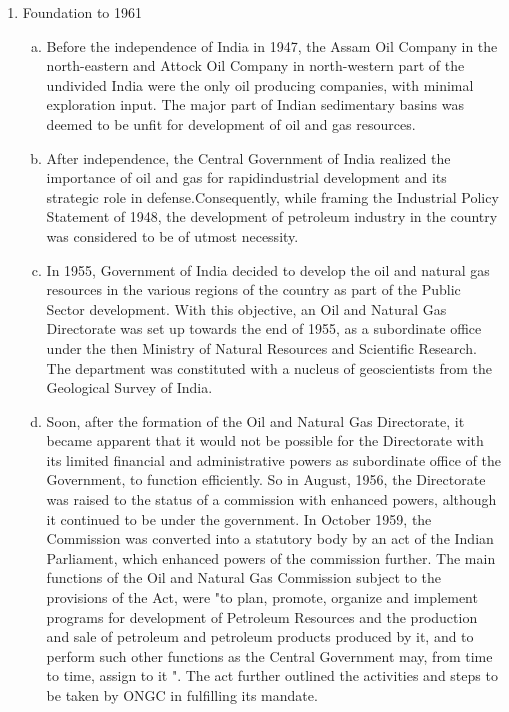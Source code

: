 \begin{enumerate}

\item Foundation to 1961

\begin{enumerate}[(a)]

\item Before the independence of India in 1947, the Assam Oil Company in the north-eastern 
and Attock Oil Company in north-western part of the undivided India were the only oil producing
companies, with minimal exploration input. The major part of Indian sedimentary basins was 
deemed to be unfit for development of oil and gas resources.

\item After independence, the Central Government of India realized the importance of oil and gas 
for rapidindustrial development and its strategic role in defense.Consequently, while framing 
the Industrial Policy Statement of 1948, the development of petroleum industry in the country 
was considered to be of utmost necessity.

\item In 1955, Government of India decided to develop the oil and natural gas resources 
in the various regions of the country as part of the Public Sector development. 
With this objective, an Oil and Natural Gas Directorate was set up towards the end of 1955,
 as a subordinate office under the then Ministry of Natural Resources and Scientific Research. 
 The department was constituted with a nucleus of geoscientists from the Geological Survey of India.

\item Soon, after the formation of the Oil and Natural Gas Directorate, it became apparent that it would 
not be possible for the Directorate with its limited financial and administrative powers as subordinate 
office of the Government, to function efficiently. So in August, 1956, the Directorate was raised to the
status of a commission with enhanced powers, although it continued to be under the government. 
In October 1959, the Commission was converted into a statutory body by an act of the Indian Parliament, 
which enhanced powers of the commission further. The main functions of the Oil and Natural Gas Commission 
subject to the provisions of the Act, were "to plan, promote, organize and implement programs for 
development of Petroleum Resources and the production and sale of petroleum and petroleum products produced 
by it, and to perform such other functions as the Central Government may, 
from time to time, assign to it ". The act further outlined the activities and steps to be taken 
by ONGC in fulfilling its mandate.


\end{enumerate}
\end{enumerate}
